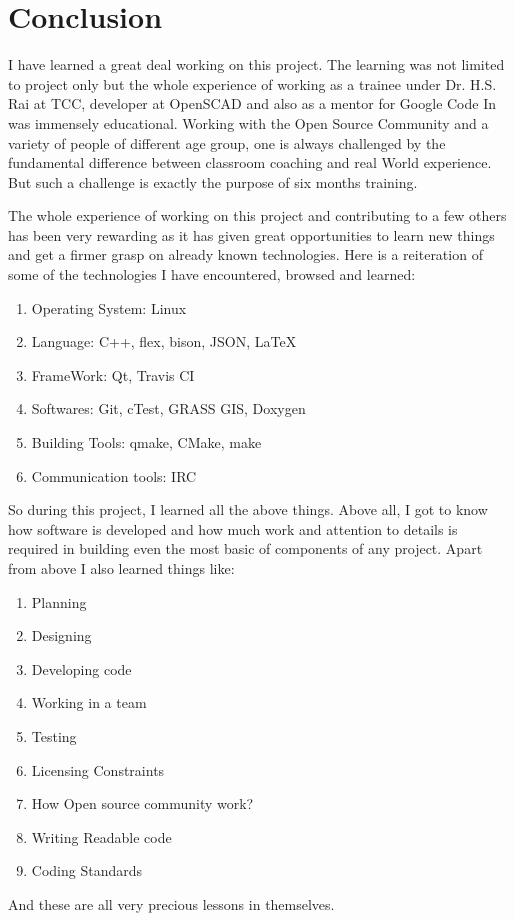 \section{Conclusion}

I have learned a great deal working on this project. The learning was not limited to project only but
the whole experience of working as a trainee under Dr. H.S. Rai at TCC, developer at OpenSCAD and also as a mentor for Google Code In was immensely educational. Working with the Open Source Community and a variety of people of different age group, one is always challenged by the fundamental difference between classroom coaching and real World experience. But such a challenge is exactly the purpose of six months training.

The whole experience of working on this project and contributing to a few others has been very
rewarding as it has given great opportunities to learn new things and get a firmer grasp on already
known technologies. Here is a reiteration of some of the technologies I have encountered, browsed and learned:
\begin{enumerate}
    \item Operating System: Linux
    \item Language: C++, flex, bison, JSON, \LaTeX
    \item FrameWork: Qt, Travis CI
    \item Softwares: Git, cTest, GRASS GIS, Doxygen
    \item Building Tools: qmake, CMake, make
    \item Communication tools: IRC
\end{enumerate}
So during this project, I learned all the above things. Above all, I got to know how software is
developed and how much work and attention to details is required in building even the most basic
of components of any project. Apart from above I also learned things like:
\begin{enumerate}
    \item Planning
    \item Designing
    \item Developing code
    \item Working in a team
    \item Testing
    \item Licensing Constraints
    \item How Open source community work?
    \item Writing Readable code
    \item Coding Standards
\end{enumerate}
And these are all very precious lessons in themselves.